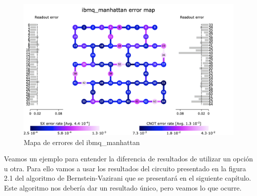  
 \begin{figure}[H]
    \centering
    \includegraphics[width=\textwidth]{TFG/imagenes/system_error_manhattan.png}
    \caption{Mapa de errores del ibmq\_manhattan} 
 \end{figure}
 
 \vspace{5pt}
 
 Veamos un ejemplo para entender la diferencia de resultados de utilizar un opción u otra. Para ello vamos a usar los resultados del circuito presentado en la figura 2.1 del algoritmo de Bernstein-Vazirani que se presentará en el siguiente capítulo. Este algoritmo nos debería dar un resultado único, pero veamos lo que ocurre. \newline

